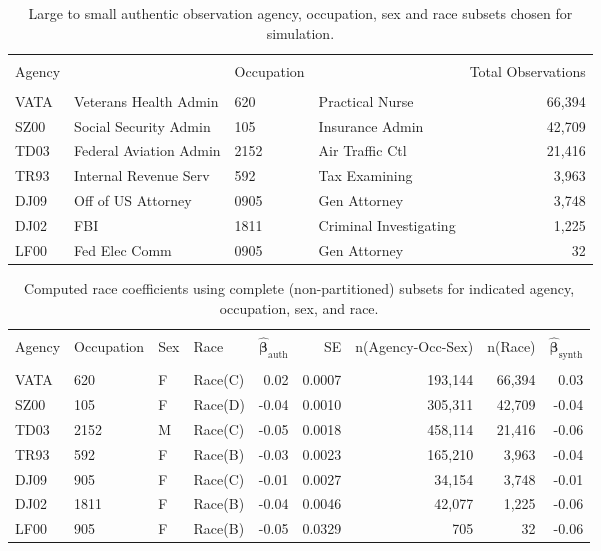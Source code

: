 \documentclass[10pt, letterpaper]{article}
\newcommand{\mest}[1]{\hat{\bm{#1}}}
\begin{document}
\begin{spacing}{1.0}
\begin{table}[h]
    \centering
    \caption{Large to small authentic observation agency, occupation, sex and race subsets chosen for simulation.}
    \begin{tabular}{llllr}
      \hline\\[-10pt]
      Agency & & Occupation & & Total Observations \\ 
      \hline\\[-6pt]
      VATA & Veterans Health Admin & 620 & Practical Nurse & 66,394 \\
      SZ00 & Social Security Admin & 105 & Insurance Admin & 42,709 \\
      TD03 & Federal Aviation Admin & 2152 & Air Traffic Ctl & 21,416 \\
      TR93 & Internal Revenue Serv & 592 & Tax Examining & 3,963 \\ 
      DJ09 & Off of US Attorney & 0905 & Gen Attorney & 3,748 \\
      DJ02 & FBI & 1811 & Criminal Investigating & 1,225 \\
      LF00 & Fed Elec Comm & 0905 & Gen Attorney & 32 \\
      \hline
    \end{tabular}
    \label{table:AgencyOcc}
\end{table}

\begin{table}[h]
    \centering
    \caption{Computed race coefficients using complete (non-partitioned) subsets for indicated agency, occupation, sex, and race.}
    \begin{tabular}{llllrrrrr}
        \hline\\[-10pt]
        Agency & Occupation & Sex & Race & $\mest{\beta}_\text{auth}$ & SE & n(Agency-Occ-Sex) & n(Race) & $\mest{\beta}_\text{synth}$ \\ 
        \hline\\[-6pt]
        VATA & 620 & F & Race(C) & 0.02 & 0.0007 & 193,144 & 66,394 & 0.03 \\ 
        SZ00 & 105 & F & Race(D) & -0.04 & 0.0010 & 305,311 & 42,709 & -0.04 \\ 
        TD03 & 2152 & M & Race(C) & -0.05 & 0.0018 & 458,114 & 21,416 & -0.06 \\ 
        TR93 & 592 & F & Race(B) & -0.03 & 0.0023 & 165,210 & 3,963 & -0.04 \\ 
        DJ09 & 905 & F & Race(C) & -0.01 & 0.0027 & 34,154 & 3,748 & -0.01 \\ 
        DJ02 & 1811 & F & Race(B) & -0.04 & 0.0046 & 42,077 & 1,225 & -0.06 \\ 
        LF00 & 905 & F & Race(B) & -0.05 & 0.0329 & 705 & 32 & -0.06 \\ 
        \hline
    \end{tabular}
    \label{table:CoefficientFullSet}
\end{table}


\end{spacing}
\end{document}
